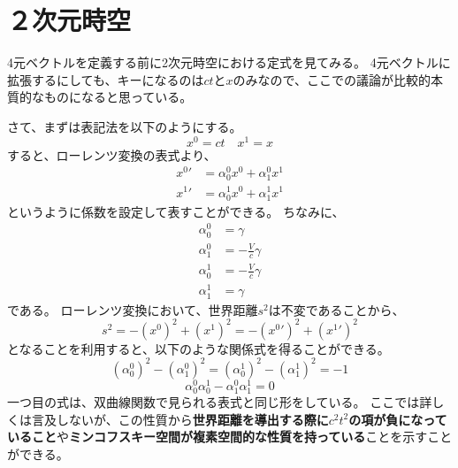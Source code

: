 \documentclass[a4paper]{jsreport}
\begin{document}
        \section{２次元時空}
            4元ベクトルを定義する前に2次元時空における定式を見てみる。
            4元ベクトルに拡張するにしても、キーになるのは$ct$と$x$のみなので、ここでの議論が比較的本質的なものになると思っている。\par
            さて、まずは表記法を以下のようにする。
            \begin{equation}
                x^0 = ct \quad x^1 = x 
            \end{equation}
            すると、ローレンツ変換の表式より、
            \begin{align}
                {x^0}' &= \alpha^0_0 x^0 + \alpha^0_1 x^1 \\
                {x^1}' &= \alpha^1_0 x^0 + \alpha^1_1 x^1
            \end{align}
            というように係数を設定して表すことができる。
            ちなみに、
            \begin{align}
                \alpha^0_0 &=  \gamma \\
                \alpha^0_1 &= - \frac{V}{c} \gamma \\
                \alpha^1_0 &= - \frac{V}{c} \gamma \\
                \alpha^1_1 &= \gamma
            \end{align}
            である。
            ローレンツ変換において、世界距離$s^2$は不変であることから、
            \begin{equation}
                s^2 = - (x^0)^2 + (x^1)^2 = - ({x^0}')^2 + ({x^1}')^2
            \end{equation}
            となることを利用すると、以下のような関係式を得ることができる。
            \begin{equation}
                (\alpha^0_0)^2 - (\alpha^0_1)^2 = (\alpha^1_0)^2 - (\alpha^1_1)^2 = -1
            \end{equation}
            \begin{equation}
                \alpha^0_0 \alpha^1_0 - \alpha^0_1 \alpha^1_1 = 0
            \end{equation}
            一つ目の式は、双曲線関数で見られる表式と同じ形をしている。
            ここでは詳しくは言及しないが、この性質から\textbf{世界距離を導出する際に$c^2t^2$の項が負になっていること}や\textbf{ミンコフスキー空間が複素空間的な性質を持っている}ことを示すことができる。\par
\end{document}

